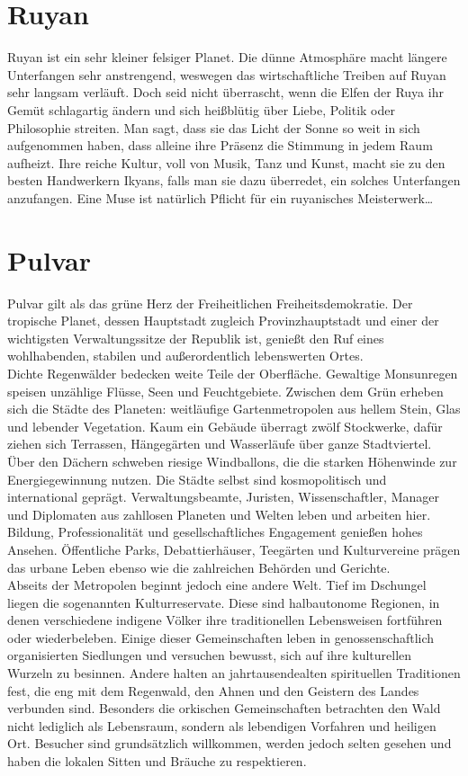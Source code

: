 \documentclass{book}
\begin{document}
\section{Ruyan}
    Ruyan ist ein sehr kleiner felsiger Planet. Die dünne Atmosphäre macht längere Unterfangen sehr anstrengend, weswegen das wirtschaftliche Treiben auf Ruyan sehr langsam verläuft. Doch seid nicht überrascht, wenn die Elfen der Ruya ihr Gemüt schlagartig ändern und sich heißblütig über Liebe, Politik oder Philosophie streiten. Man sagt, dass sie das Licht der Sonne so weit in sich aufgenommen haben, dass alleine ihre Präsenz die Stimmung in jedem Raum aufheizt. Ihre reiche Kultur, voll von Musik, Tanz und Kunst, macht sie zu den besten Handwerkern Ikyans, falls man sie dazu überredet, ein solches Unterfangen anzufangen. Eine Muse ist natürlich Pflicht für ein ruyanisches Meisterwerk\dots\\

\section{Pulvar}
    Pulvar gilt als das grüne Herz der Freiheitlichen Freiheitsdemokratie. Der tropische Planet, dessen Hauptstadt zugleich Provinzhauptstadt und einer der wichtigsten Verwaltungssitze der Republik ist, genießt den Ruf eines wohlhabenden, stabilen und außerordentlich lebenswerten Ortes.\\
    Dichte Regenwälder bedecken weite Teile der Oberfläche. Gewaltige Monsunregen speisen unzählige Flüsse, Seen und Feuchtgebiete. Zwischen dem Grün erheben sich die Städte des Planeten: weitläufige Gartenmetropolen aus hellem Stein, Glas und lebender Vegetation. Kaum ein Gebäude überragt zwölf Stockwerke, dafür ziehen sich Terrassen, Hängegärten und Wasserläufe über ganze Stadtviertel. Über den Dächern schweben riesige Windballons, die die starken Höhenwinde zur Energiegewinnung nutzen. Die Städte selbst sind kosmopolitisch und international geprägt. Verwaltungsbeamte, Juristen, Wissenschaftler, Manager und Diplomaten aus zahllosen Planeten und Welten leben und arbeiten hier. Bildung, Professionalität und gesellschaftliches Engagement genießen hohes Ansehen. Öffentliche Parks, Debattierhäuser, Teegärten und Kulturvereine prägen das urbane Leben ebenso wie die zahlreichen Behörden und Gerichte.\\
    Abseits der Metropolen beginnt jedoch eine andere Welt. Tief im Dschungel liegen die sogenannten Kulturreservate. Diese sind halbautonome Regionen, in denen verschiedene indigene Völker ihre traditionellen Lebensweisen fortführen oder wiederbeleben. Einige dieser Gemeinschaften leben in genossenschaftlich organisierten Siedlungen und versuchen bewusst, sich auf ihre kulturellen Wurzeln zu besinnen. Andere halten an jahrtausendealten spirituellen Traditionen fest, die eng mit dem Regenwald, den Ahnen und den Geistern des Landes verbunden sind. Besonders die orkischen Gemeinschaften betrachten den Wald nicht lediglich als Lebensraum, sondern als lebendigen Vorfahren und heiligen Ort. Besucher sind grundsätzlich willkommen, werden jedoch selten gesehen und haben die lokalen Sitten und Bräuche zu respektieren.\\
\end{document}
